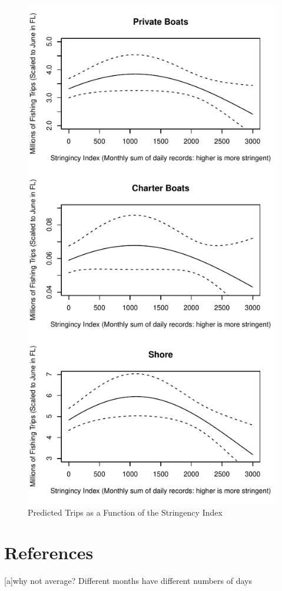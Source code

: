\documentclass[10pt,letterpaper]{article}
\begin{document}
\begin{figure}
\centering
\includegraphics{C19PolicyRec_files/figure-latex/tripStringRel-1.pdf}
\caption{Predicted Trips as a Function of the Stringency Index}
\end{figure}

\hypertarget{references}{%
\section*{References}\label{references}}

{[}a{]}why not average? Different months have different numbers of days

\nolinenumbers
\end{document}
